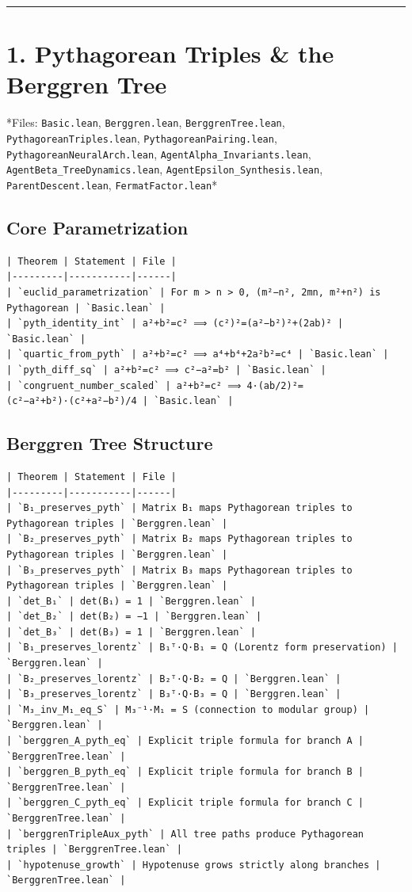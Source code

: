 \documentclass[12pt,a4paper,openany]{book}
\begin{document}
\bigskip\hrule\bigskip

\section{1. Pythagorean Triples \& the Berggren Tree}

*Files: \texttt{Basic.lean}, \texttt{Berggren.lean}, \texttt{BerggrenTree.lean}, \texttt{PythagoreanTriples.lean}, \texttt{PythagoreanPairing.lean}, \texttt{PythagoreanNeuralArch.lean}, \texttt{AgentAlpha\_Invariants.lean}, \texttt{AgentBeta\_TreeDynamics.lean}, \texttt{AgentEpsilon\_Synthesis.lean}, \texttt{ParentDescent.lean}, \texttt{FermatFactor.lean}*

\subsection{Core Parametrization}
\begin{verbatim}
| Theorem | Statement | File |
|---------|-----------|------|
| `euclid_parametrization` | For m > n > 0, (m²−n², 2mn, m²+n²) is Pythagorean | `Basic.lean` |
| `pyth_identity_int` | a²+b²=c² ⟹ (c²)²=(a²−b²)²+(2ab)² | `Basic.lean` |
| `quartic_from_pyth` | a²+b²=c² ⟹ a⁴+b⁴+2a²b²=c⁴ | `Basic.lean` |
| `pyth_diff_sq` | a²+b²=c² ⟹ c²−a²=b² | `Basic.lean` |
| `congruent_number_scaled` | a²+b²=c² ⟹ 4·(ab/2)²=(c²−a²+b²)·(c²+a²−b²)/4 | `Basic.lean` |
\end{verbatim}

\subsection{Berggren Tree Structure}
\begin{verbatim}
| Theorem | Statement | File |
|---------|-----------|------|
| `B₁_preserves_pyth` | Matrix B₁ maps Pythagorean triples to Pythagorean triples | `Berggren.lean` |
| `B₂_preserves_pyth` | Matrix B₂ maps Pythagorean triples to Pythagorean triples | `Berggren.lean` |
| `B₃_preserves_pyth` | Matrix B₃ maps Pythagorean triples to Pythagorean triples | `Berggren.lean` |
| `det_B₁` | det(B₁) = 1 | `Berggren.lean` |
| `det_B₂` | det(B₂) = −1 | `Berggren.lean` |
| `det_B₃` | det(B₃) = 1 | `Berggren.lean` |
| `B₁_preserves_lorentz` | B₁ᵀ·Q·B₁ = Q (Lorentz form preservation) | `Berggren.lean` |
| `B₂_preserves_lorentz` | B₂ᵀ·Q·B₂ = Q | `Berggren.lean` |
| `B₃_preserves_lorentz` | B₃ᵀ·Q·B₃ = Q | `Berggren.lean` |
| `M₃_inv_M₁_eq_S` | M₃⁻¹·M₁ = S (connection to modular group) | `Berggren.lean` |
| `berggren_A_pyth_eq` | Explicit triple formula for branch A | `BerggrenTree.lean` |
| `berggren_B_pyth_eq` | Explicit triple formula for branch B | `BerggrenTree.lean` |
| `berggren_C_pyth_eq` | Explicit triple formula for branch C | `BerggrenTree.lean` |
| `berggrenTripleAux_pyth` | All tree paths produce Pythagorean triples | `BerggrenTree.lean` |
| `hypotenuse_growth` | Hypotenuse grows strictly along branches | `BerggrenTree.lean` |
\end{verbatim}
\end{document}
